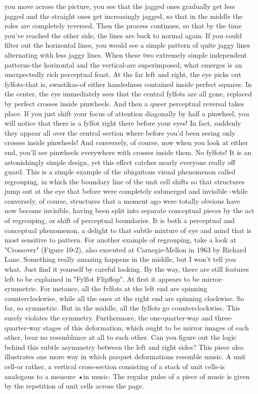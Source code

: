 you move across the picture, you see that the jagged ones gradually get less jagged and
the straight ones get increasingly jagged, so that in the middle the roles are completely
reversed. Then the process continues, so that by the time you've reached the other side,
the lines are back to normal again. If you could filter out the horizontal lines, you would
see a simple pattern of quite jaggy lines alternating with less jaggy lines.
         When these two extremely simple independent patterns-the horizontal and the
vertical-are superimposed, what emerges is an unexpectedly rich perceptual feast. At the
far left and right, the eye picks out fylfots-that is, swastikas-of either handedness
contained inside perfect squares. In the center, the eye immediately sees that the central
fylfots are all gone, replaced by perfect crosses inside pinwheels.
         And then a queer perceptual reversal takes place. If you just shift your focus of
attention diagonally by half a pinwheel, you will notice that there is a fylfot right there
before your eyes! In fact, suddenly they appear all over the central section where before
you'd been seeing only crosses inside pinwheels! And conversely, of course, now when
you look at either end, you'll see pinwheels everywhere with crosses inside them. No
fylfots! It is an astonishingly simple design, yet this effect catches nearly everyone really
off guard.
         This is a simple example of the ubiquitous visual phenomenon called regrouping,
in which the boundary line of the unit cell shifts so that structures jump out at the eye that
before were completely submerged and invisible -while conversely, of course, structures
that a moment ago were totally obvious have now become invisible, having been split
into separate conceptual pieces by the act of regrouping, or shift of perceptual
boundaries. It is both a perceptual and conceptual phenomenon, a delight to that subtle
mixture of eye and mind that is most sensitive to pattern.
         For another example of regrouping, take a look at "Crossover" (Figure 10-2), also
executed at Carnegie-Mellon in 1963 by Richard Lane. Something really amazing
happens in the middle, but I won't tell you what. Just find it yourself by careful looking.
         By the way, there are still features left to be explained in "Fylfot Flipflop". At
first it appears to be mirror-symmetric. For instance, all the fvlfots at the left end are
spinning counterclockwise, while all the ones at the right end are spinning clockwise. So
far, so symmetric. But in the middle, all the fylfots go counterclockwise. This surely
violates the symmetry. Furthermore, the one-quarter-way and three-quarter-way stages of
this deformation, which ought to be mirror images of each other, bear no resemblance at
all to each other. Can you figure out the logic behind this subtle asymmetry between the
left and right sides?
         This piece also illustrates one more way in which parquet deformations resemble
music. A unit cell-or rather, a vertical cross-section consisting of a stack of unit cells-is
analogous to a measure •in music. The regular pulse of a piece of music is given by the
repetition of unit cells across the page.




